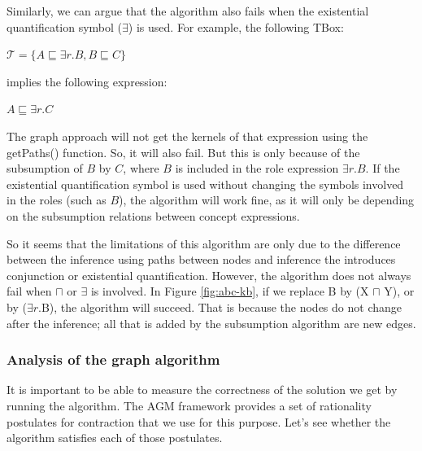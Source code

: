 \documentclass{sfuthesis}
\theoremstyle{plain}
\theoremstyle{definition}
\begin{document}
Similarly, we can argue that the algorithm also fails when the existential quantification symbol ($\exists$) is used. For example, the following TBox:
\begin{center}
$\mathcal{T} = \lbrace A \sqsubseteq \exists r.B, B \sqsubseteq C \rbrace$
\end{center}
implies the following expression:
\begin{center}
$A \sqsubseteq \exists r.C$
\end{center}
The graph approach will not get the kernels of that expression using the getPaths() function. So, it will also fail. But this is only because of the subsumption of $B$ by $C$, where $B$ is included in the role expression $\exists r.B$. If the existential quantification symbol is used without changing the symbols involved in the roles (such as $B$), the algorithm will work fine, as it will only be depending on the subsumption relations between concept expressions.

So it seems that the limitations of this algorithm are only due to the difference between the inference using paths between nodes and inference the introduces conjunction or existential quantification. However, the algorithm does not always fail when $\sqcap$ or $\exists$ is involved. In Figure \ref{fig:abc-kb}, if we replace B by (X $\sqcap$ Y), or by  ($\exists r.$B), the algorithm will succeed. That is because the nodes do not change after the inference; all that is added by the subsumption algorithm are new edges. 


\subsubsection{Analysis of the graph algorithm}
It is important to be able to measure the correctness of the solution we get by running the algorithm. The AGM framework provides a set of rationality postulates for contraction that we use for this purpose. Let's see whether the algorithm satisfies each of those postulates. 
\end{document}
